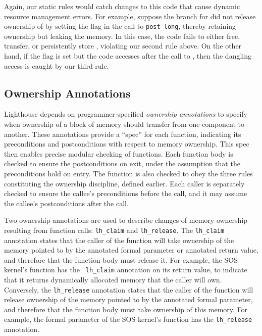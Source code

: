 Again, our static rules would catch changes to this code that cause dynamic
resource management errors.
%
For example, suppose the branch for  did not release
ownership of  by setting the  flag in the
call to {\tt post\_long}, thereby retaining ownership but leaking the
memory.    
%
In this case, the code fails to either free, transfer, or persistently store
, violating our second rule above.  
%
On the other hand, if the  flag is set but the code
accesses  after the call to , then the dangling
access is caught by our third rule.
 




\subsection{Ownership Annotations}


Lighthouse depends on programmer-specified {\em ownership annotations} to
specify when ownership of a block of memory should transfer from one
component to another.
%
These annotations provide a ``spec'' for each function, indicating its
preconditions and postconditions with respect to memory ownership.  
%
This spec then enables precise modular checking of functions.  
%
Each function body is checked to ensure the postconditions on exit, under
the assumption that the preconditions hold on entry.  
%
The function is also checked to obey the three rules constituting the
ownership discipline, defined earlier.  
%
Each caller is separately checked to ensure the callee's preconditions
before the call, and it may assume the callee's postconditions after the
call.



Two ownership annotations are used to describe changes of memory ownership
resulting from function calls: {\tt lh\_claim} and {\tt lh\_release}.
%
The {\tt lh\_claim} annotation states that the caller of the function will
take ownership of the memory pointed to by the annotated formal parameter or
annotated return value, and therefore that the function body must release
it.
%
For example, the SOS kernel's  function has the {\tt
lh\_claim} annotation on its return value, to indicate that it returns
dynamically allocated memory that the caller will own.
%
Conversely, the {\tt lh\_release} annotation states that the caller of the
function will release ownership of the memory pointed to by the annotated
formal parameter, and therefore that the function body must take ownership
of this memory.
%
For example, the formal parameter of the SOS kernel's 
function has the {\tt lh\_release} annotation.



